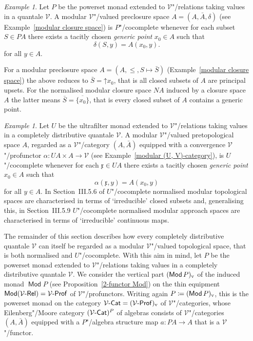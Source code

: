 \documentclass[preprint, a4paper]{elsarticle}
\theoremstyle{definition}
\theoremstyle{remark}
\newtheorem{example}[theorem]{Example}
\providecommand{\exref}[1]{Example~\ref{#1}}
\providecommand{\propref}[1]{Proposition~\ref{#1}}
\providecommand{\dfn}{\coloneqq}
\providecommand{\mf}[1]{\mathfrak{#1}}
\providecommand{\brcs}[1]{\lbrace #1 \rbrace}
\providecommand{\set}[1]{\brcs{#1}}
\providecommand{\upset}{\mathord\uparrow}
\providecommand{\map}[3]{#1\colon#2\to#3}
\providecommand{\catvar}[1]{\mathcal{#1}}
\providecommand{\2}{\mathsf 2}
\providecommand{\V}{\catvar V}
\providecommand{\Cat}{\mathsf{Cat}}
\providecommand{\enCat}[1]{#1\text-\Cat}
\providecommand{\Rel}{\mathsf{Rel}}
\providecommand{\enRel}[1]{#1\text-\Rel}
\DeclareMathOperator{\Mod}{\mathsf{Mod}}
\providecommand{\Prof}{\mathsf{Prof}}
\providecommand{\enProf}[1]{#1\text-\Prof}
\begin{document}
	\begin{example} \label{complete modular closure space}
		Let $P$ be the powerset monad extended to $\V$"/relations taking values in a quantale $\V$. A modular $\V$"/valued preclosure space $A = (A, \bar A, \delta)$ (see \exref{modular closure space}) is $P$"/cocomplete whenever for each subset $S \in PA$ there exists a tacitly chosen \emph{generic point} $x_0 \in A$ such that
		\begin{displaymath}
			\delta (S, y) = A(x_0, y).
		\end{displaymath}
		for all $y \in A$.
		
		For a modular preclosure space $A = (A, \leq, S \mapsto \bar S)$ (\exref{modular closure space}) the above reduces to $\bar S = \upset x_0$, that is all closed subsets of $A$ are principal upsets. For the normalised modular closure space $NA$ induced by a closure space $A$ the latter means $\bar S = \overline{\set{x_0}}$, that is every closed subset of $A$ contains a generic point.
	\end{example}
	
	\begin{example} \label{complete modular approach space}
		Let $U$ be the ultrafilter monad extended to $\V$"/relations taking values in a completely distributive quantale $\V$. A modular $\V$"/valued pretopological space $A$, regarded as a $\V$"/category $(A, \bar A)$ equipped with a convergence $\V$"/profunctor \mbox{$\map\alpha{UA \times A}\V$} (see \exref{modular (U, V)-category}), is $U$"/cocomplete whenever for each $\mf x \in UA$ there exists a tacitly chosen \emph{generic point} $x_0 \in A$ such that
		\begin{displaymath}
			\alpha(\mf x, y) = A(x_0, y)
		\end{displaymath}
		for all $y \in A$. In Section~III.5.6 of \cite{Hofmann-Seal-Tholen14} $U$"/cocomplete normalised modular topological spaces are characterised in terms of `irreducible' closed subsets and, generalising this, in Section~III.5.9 $U$"/cocomplete normalised modular approach spaces are characterised in terms of `irreducible' continuous maps.
	\end{example}
	
	The remainder of this section describes how every completely distributive quantale $\V$ can itself be regarded as a modular $\V$"/valued topological space, that is both normalised and $U$"/cocomplete. With this aim in mind, let $P$ be the powerset monad extended to $\V$"/relations taking values in a completely distributive quantale $\V$. We consider the vertical part $(\Mod P)_\textup v$ of the induced monad $\Mod P$ (see \propref{2-functor Mod}) on the thin equipment $\Mod(\enRel\V) = \enProf\V$ of $\V$"/profunctors. Writing again $P \dfn (\Mod P)_\textup v$, this is the powerset monad on the category $\enCat\V = (\enProf\V)_\textup v$ of $\V$"/categories, whose Eilenberg"/Moore category $(\enCat\V)^P$ of algebras consists of $\V$"/categories $(A, \bar A)$ equipped with a $P$"/algebra structure map $\map a{PA}A$ that is a $\V$"/functor.
		
\end{document}
